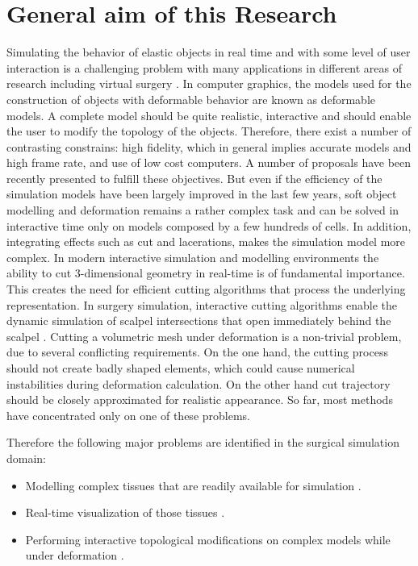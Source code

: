 

\label{chapter:introduction}
\section{General aim of this Research}
Simulating the behavior of elastic objects in real time and with some level of user interaction is a challenging problem 
with many applications in different areas of research including virtual surgery \cite{Meier2005}. 
In computer graphics, the models used for the construction of objects with deformable behavior are known as deformable models. 
A complete model should be quite realistic, interactive and should enable the user to modify the topology of the objects.
Therefore, there exist a number of contrasting constrains: high fidelity, which in general implies accurate models and high frame rate,
and use of low cost computers. A number of proposals have been recently presented to fulfill these objectives. But even if the efficiency
of the simulation models have been largely improved in the last few years, soft object modelling and deformation remains a rather 
complex task and can be solved in interactive time only on models composed by a few hundreds of cells. In addition, integrating effects
such as cut and lacerations, makes the simulation model more complex. In modern interactive simulation and modelling environments the ability to 
cut 3-dimensional geometry in real-time is of fundamental importance. This creates the need for efficient cutting algorithms that process the 
underlying representation. In surgery simulation, interactive cutting algorithms enable the dynamic simulation of scalpel intersections that open 
immediately behind the scalpel \cite{Nienhuys2001}. Cutting a volumetric mesh under deformation is a non-trivial problem, due to several conflicting
requirements. On the one hand, the cutting process should not create badly shaped elements, which could cause numerical instabilities during deformation
calculation. On the other hand cut trajectory should be closely approximated for realistic appearance. So far, most methods have concentrated only on 
one of these problems. 

Therefore the following major problems are identified in the surgical simulation domain:

\begin{itemize}
 \item Modelling complex tissues that are readily available for simulation \cite{Nealen2006,Meier2005,Gibson1997a}.
 \item Real-time visualization of those tissues \cite{Mario2010PolygonMesh,Bloomenthal1997}.
 \item Performing interactive topological modifications on complex models while under deformation \cite{Jin2013,Wu2011,Courtecuisse2010a,Jerabkova2010}. 
\end{itemize}

